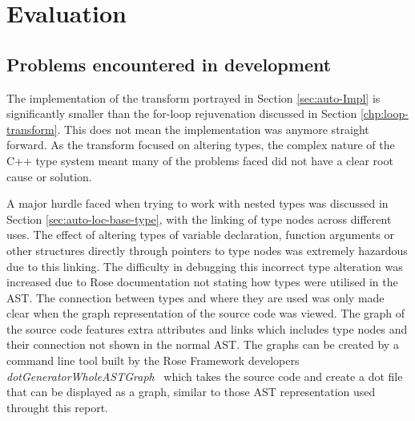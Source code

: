 \documentclass[bsc,frontabs,singlespacing,twoside,parskip,deptreport]{infthesis}
\begin{document}



    
\section{Evaluation} %

\subsection{Problems encountered in development}\label{sec:probs-in-auto-dev}

The implementation of the transform portrayed in Section \ref{sec:auto-Impl} is significantly smaller than the for-loop rejuvenation discussed in Section \ref{chp:loop-transform}. This does not mean the implementation was anymore straight forward. As the transform focused on altering types, the complex nature of the C++ type system meant many of the problems faced did not have a clear root cause or solution.

A major hurdle faced when trying to work with nested types was discussed in Section \ref{sec:auto-loc-base-type}, with the linking of type nodes across different uses. The effect of altering types of variable declaration, function arguments or other structures directly through pointers to type nodes was extremely hazardous due to this linking. The difficulty in debugging this incorrect type alteration was increased due to Rose documentation not stating how types were utilised in the AST. The connection between types and where they are used was only made clear when the graph representation of the source code was viewed. The graph of the source code features extra attributes and links which includes type nodes and their connection not shown in the normal AST. The graphs can be created by a command line tool built by the Rose Framework developers \textit{dotGeneratorWholeASTGraph}~\cite{ROSE_TUT} which takes the source code and create a dot file that can be displayed as a graph, similar to those AST representation used throught this report.
\end{document}
